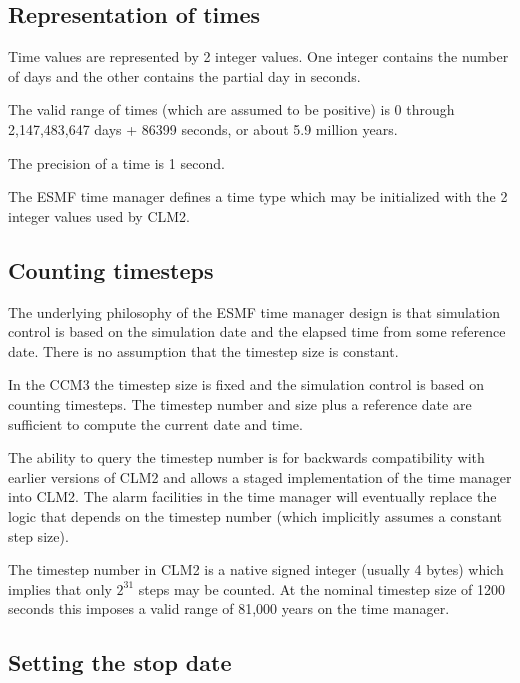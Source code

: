 \documentclass[12pt]{article}
\begin{document}
\subsection{Representation of times}

Time values are represented by 2 integer values.  One integer contains the
number of days and the other contains the partial day in seconds.

The valid range of times (which are assumed to be positive) is 0 through
2,147,483,647 days + 86399 seconds, or about 5.9 million years.

The precision of a time is 1 second.

The ESMF time manager defines a time type which may be initialized with the
2 integer values used by CLM2.

\subsection{Counting timesteps}

The underlying philosophy of the ESMF time manager design is that
simulation control is based on the simulation date and the elapsed time
from some reference date.  There is no assumption that the timestep size is
constant.

In the CCM3 the timestep size is fixed and the simulation control is based
on counting timesteps.  The timestep number and size plus a reference date
are sufficient to compute the current date and time.

The ability to query the timestep number is for backwards compatibility
with earlier versions of CLM2 and allows a staged implementation of the time manager into
CLM2.  The alarm facilities in the time manager will eventually replace
the logic that depends on the timestep number (which implicitly assumes a
constant step size).

The timestep number in CLM2 is a native signed integer (usually 4 bytes)
which implies that only $2^{31}$ steps may be counted.  At the nominal
timestep size of 1200 seconds this imposes a valid range of 81,000 years on
the time manager.

\subsection{Setting the stop date}
\end{document}
